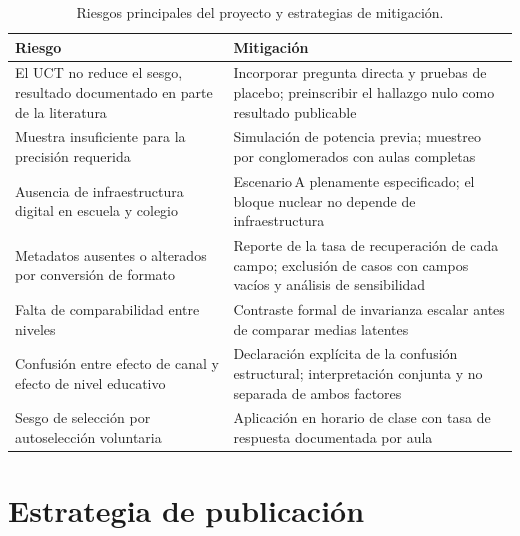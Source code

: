 \documentclass[11pt,a4paper]{article}
\begin{document}
\begin{table}[htbp]
	\centering
	\small
	\caption{Riesgos principales del proyecto y estrategias de mitigación.}
	\begin{tabularx}{\textwidth}{L{4.6cm} X}
		\toprule
		\textbf{Riesgo} & \textbf{Mitigación} \\
		\midrule
		El UCT no reduce el sesgo, resultado documentado en parte de la literatura & Incorporar pregunta directa y pruebas de placebo; preinscribir el hallazgo nulo como resultado publicable \\
		\addlinespace
		Muestra insuficiente para la precisión requerida & Simulación de potencia previa; muestreo por conglomerados con aulas completas \\
		\addlinespace
		Ausencia de infraestructura digital en escuela y colegio & Escenario\,A plenamente especificado; el bloque nuclear no depende de infraestructura \\
		\addlinespace
		Metadatos ausentes o alterados por conversión de formato & Reporte de la tasa de recuperación de cada campo; exclusión de casos con campos vacíos y análisis de sensibilidad \\
		\addlinespace
		Falta de comparabilidad entre niveles & Contraste formal de invarianza escalar antes de comparar medias latentes \\
		\addlinespace
		Confusión entre efecto de canal y efecto de nivel educativo & Declaración explícita de la confusión estructural; interpretación conjunta y no separada de ambos factores \\
		\addlinespace
		Sesgo de selección por autoselección voluntaria & Aplicación en horario de clase con tasa de respuesta documentada por aula \\
		\bottomrule
	\end{tabularx}
\end{table}

\section{Estrategia de publicación}
\end{document}
